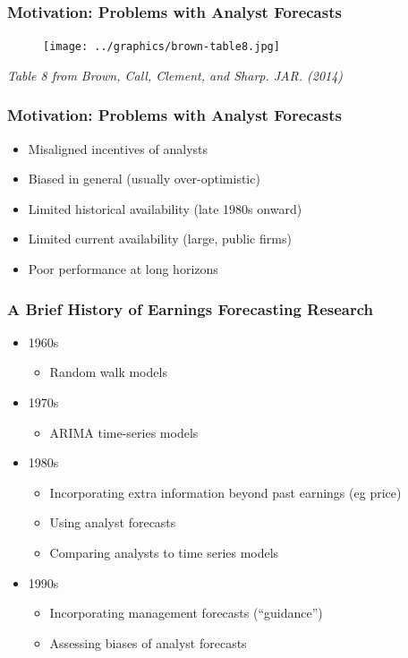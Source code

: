 \documentclass{beamer}
\begin{document}
\begin{frame}
\frametitle{Motivation: Problems with Analyst Forecasts}
\begin{center}
 \begin{figure}
    \texttt{[image: ../graphics/brown-table8.jpg]}
\end{figure}
\end{center}
\emph{Table 8 from Brown, Call, Clement, and Sharp. JAR. (2014)}
\end{frame}

\begin{frame}
\frametitle{Motivation: Problems with Analyst Forecasts}
\begin{itemize}
\item Misaligned incentives of analysts
\item Biased in general (usually over-optimistic)
\item Limited historical availability (late 1980s onward)
\item Limited current availability (large, public firms)
\item Poor performance at long horizons
\end{itemize}
\end{frame}

\begin{frame}
\frametitle{A Brief History of Earnings Forecasting Research}
\begin{itemize}
\item 1960s
\begin{itemize}
\item Random walk models
\end{itemize}

\item 1970s
\begin{itemize}
\item ARIMA time-series models 
\end{itemize}

\item 1980s
\begin{itemize}
\item Incorporating extra information beyond past earnings (eg price)
\item Using analyst forecasts
\item Comparing analysts to time series models
\end{itemize}

\item 1990s
\begin{itemize}
\item Incorporating management forecasts (``guidance'')
\item Assessing biases of analyst forecasts
\end{itemize}
\end{itemize}
\end{frame}
\end{document}
